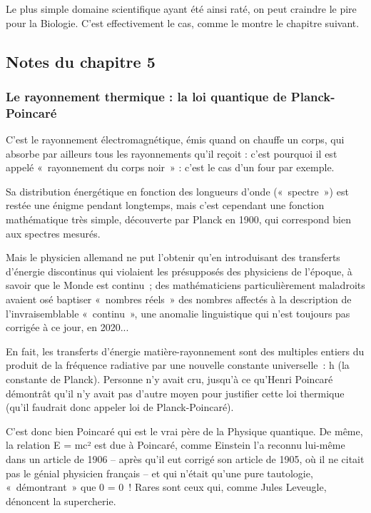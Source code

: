 \documentclass[a4paper,12pt]{article}
\begin{document}
Le plus simple domaine scientifique ayant été ainsi raté, on peut craindre le pire pour la Biologie. C’est effectivement le cas, comme le montre le chapitre suivant.

\subsection{Notes du chapitre 5}

\subsubsection {Le rayonnement thermique : la loi quantique de Planck-Poincaré}

C'est le rayonnement électromagnétique, émis quand on chauffe un corps, qui absorbe par ailleurs tous les rayonnements qu'il reçoit : c'est pourquoi il est appelé « rayonnement du corps noir » : c'est le cas d'un four par exemple.


Sa distribution énergétique en fonction des longueurs d'onde (« spectre ») est restée une énigme pendant longtemps, mais c'est cependant une fonction mathématique très simple, découverte par Planck en 1900, qui correspond bien aux spectres mesurés.


Mais le physicien allemand ne put l'obtenir qu'en introduisant des transferts d'énergie discontinus qui violaient les présupposés des physiciens de l'époque, à savoir que le Monde est continu ; des mathématiciens particulièrement maladroits avaient osé baptiser « nombres réels » des nombres affectés à la description de l'invraisemblable « continu », une anomalie linguistique qui n'est toujours pas corrigée à ce jour, en 2020... 


En fait, les transferts d'énergie matière-rayonnement sont des multiples entiers du produit de la fréquence radiative par une nouvelle constante universelle : h (la constante de Planck). Personne n'y avait cru, jusqu'à ce qu'Henri Poincaré démontrât qu'il n'y avait pas d'autre moyen pour justifier cette loi thermique (qu'il faudrait donc appeler loi de Planck-Poincaré). 


C'est donc bien Poincaré qui est le vrai père de la Physique quantique. De même, la relation E = mc² est due à Poincaré, comme Einstein l'a reconnu lui-même dans un article de 1906 – après qu'il eut corrigé son article de 1905, où il ne citait pas le génial physicien français – et qui n'était qu'une pure tautologie, « démontrant » que 0 = 0 ! Rares sont ceux qui, comme Jules Leveugle, dénoncent la supercherie.
\end{document}
